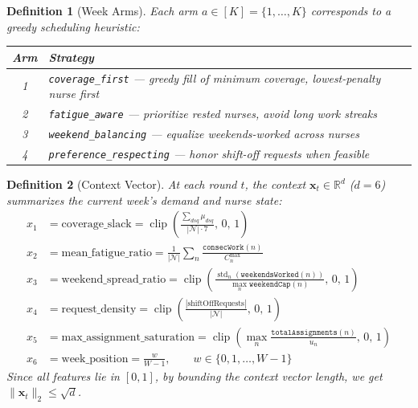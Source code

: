 \documentclass[11pt]{article}
\newtheorem{definition}{Definition}
\begin{document}
\begin{definition}[Week Arms]
  Each arm $a \in [K] = \{1,\ldots,K\}$ corresponds to a greedy
  scheduling heuristic:
  \begin{center}
  \begin{tabular}{cl}
    \toprule
    Arm & Strategy \\
    \midrule
        1 & \texttt{coverage\_first}        --- greedy fill of minimum coverage, lowest-penalty nurse first \\
        2 & \texttt{fatigue\_aware}         --- prioritize rested nurses, avoid long work streaks \\
        3 & \texttt{weekend\_balancing}     --- equalize weekends-worked across nurses \\
        4 & \texttt{preference\_respecting} --- honor shift-off requests when feasible \\
    \bottomrule
  \end{tabular}
  \end{center}
\end{definition}

\begin{definition}[Context Vector]
  At each round $t$, the context $\mathbf{x}_t \in \mathbb{R}^d$
  ($d = 6$) summarizes the current week's demand and nurse state:
  \begin{align*}
    x_1 &= \text{coverage\_slack}
         = \operatorname{clip}\!\left(\frac{\sum_{dsq}\mu_{dsq}}{|\mathcal{N}|\cdot 7},\, 0,\, 1\right) \\
    x_2 &= \text{mean\_fatigue\_ratio}
         = \frac{1}{|\mathcal{N}|}\sum_{n}\frac{\texttt{consecWork}(n)}{C_n^{\max}} \\
    x_3 &= \text{weekend\_spread\_ratio}
         = \operatorname{clip}\!\left(\frac{\operatorname{std}_n(\texttt{weekendsWorked}(n))}{\max_n \texttt{weekendCap}(n)},\, 0,\, 1\right) \\
    x_4 &= \text{request\_density}
         = \operatorname{clip}\!\left(\frac{|\text{shiftOffRequests}|}{|\mathcal{N}|},\, 0,\, 1\right) \\
    x_5 &= \text{max\_assignment\_saturation}
         = \operatorname{clip}\!\left(\max_n \frac{\texttt{totalAssignments}(n)}{u_n},\, 0,\, 1\right) \\
    x_6 &= \text{week\_position}
     = \frac{w}{W - 1}, \qquad w \in \{0, 1, \ldots, W-1\}
  \end{align*}
  Since all features lie in $[0, 1]$, by bounding the context vector length, we get $\|\mathbf{x}_t\|_2 \leq \sqrt{d}$.
\end{definition}
\end{document}
